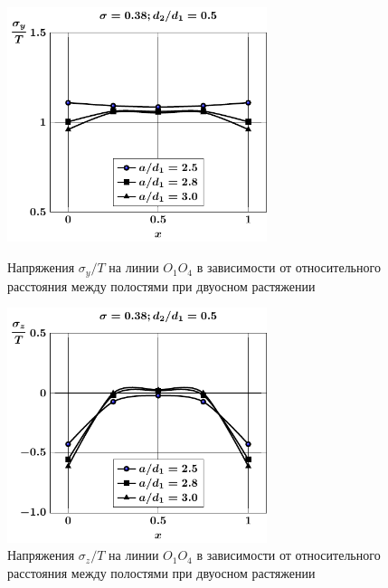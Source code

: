 \begin{figure}[h!]
\centering\footnotesize
\parbox[b]{7.5cm}{\centering\includegraphics[width=7.6cm]{cav4-oblate-a-d50-t2-sig_y.pdf}
\caption{Напряжения $\sigma_y/T$ на линии $O_1O_4$ в зависимости от относительного расстояния между полостями при двуосном растяжении
\label{f:10:6}}}\hfil\hfil
\parbox[b]{7.5cm}{\centering\includegraphics[width=7.6cm]{cav4-oblate-a-d50-t2-sig_z.pdf}
\caption{Напряжения $\sigma_z/T$ на линии $O_1O_4$ в зависимости от относительного расстояния между полостями при двуосном растяжении
\label{f:10:7}}}
\end{figure}

